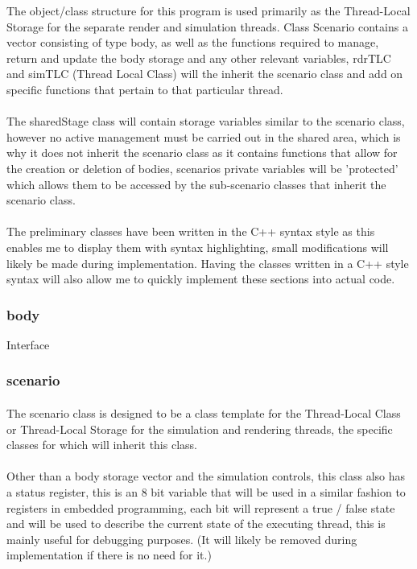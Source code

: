 The object/class structure for this program is used primarily as the Thread-Local Storage for the separate render and simulation threads. Class Scenario contains a vector consisting of type body, as well as the functions required to manage, return and update the body storage and any other relevant variables, rdrTLC and simTLC (Thread Local Class) will the inherit the scenario class and add on specific functions that pertain to that particular thread.

\paragraph{}
The sharedStage class will contain storage variables similar to the scenario class, however no active management must be carried out in the shared area, which is why it does not inherit the scenario class as it contains functions that allow for the creation or deletion of bodies, scenarios private variables will be 'protected' which allows them to be accessed by the sub-scenario classes that inherit the scenario class.

\paragraph{}
The preliminary classes have been written in the C++ syntax style as this enables me to display them with syntax highlighting, small modifications will likely be made during implementation. Having the classes written in a C++ style syntax will also allow me to quickly implement these sections into actual code.

\pagebreak
\subsubsection{body}
\texttt{} 
Interface 
\pagebreak
\subsubsection{scenario}
\texttt{}
\paragraph{}
The scenario class is designed to be a class template for the Thread-Local Class or Thread-Local Storage for the simulation and rendering threads, the specific classes for which will inherit this class.

\paragraph{}
Other than a body storage vector and the simulation controls, this class also has a status register, this is an 8 bit variable that will be used in a similar fashion to registers in embedded programming, each bit will represent a true / false state and will be used to describe the current state of the executing thread, this is mainly useful for debugging purposes. (It will likely be removed during implementation if there is no need for it.)

